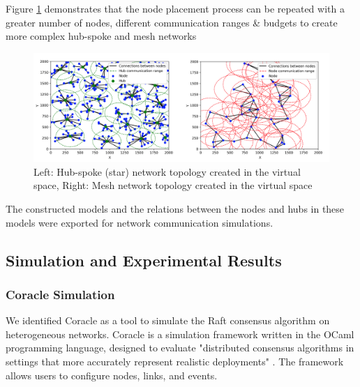 Figure \ref{fig:modeling_complex} demonstrates that the node placement process can be repeated with a greater number of nodes, different communication ranges \& budgets to create more complex hub-spoke and mesh networks
\begin{figure}[H]
    \centering
    \includegraphics[width=0.88\columnwidth]{images/modeling_complex_unified.png}
    \caption{Left: Hub-spoke (star) network topology created in the virtual space, Right: Mesh network topology created in the virtual space}
    \label{fig:modeling_complex}
\end{figure}

The constructed models and the relations between the nodes and hubs in these models were exported for network communication simulations.




\subsection{Simulation and Experimental Results}

\subsubsection{Coracle Simulation}

We identified Coracle \cite{Coracle} as a tool to simulate the Raft consensus algorithm on heterogeneous networks. Coracle is a simulation framework written in the OCaml programming language, designed to evaluate "distributed consensus algorithms in settings that more accurately represent realistic deployments" \cite{howardCoracleEvaluatingConsensus2015}. The framework allows users to configure nodes, links, and events. 

